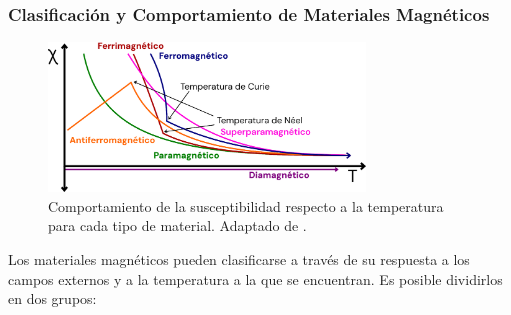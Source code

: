 \documentclass[../main.tex]{subfiles}
\begin{document}
\subsubsection{Clasificación y Comportamiento de Materiales Magnéticos} \label{sec:magtemp}
\begin{figure}[H]
    \centering
    \includegraphics[width=0.75\textwidth]{fig/chitemp.png}
    \caption{Comportamiento de la susceptibilidad respecto a la temperatura para cada tipo de material. Adaptado de \cite{Ohl2021}.}
    \label{fig:chitemp}
\end{figure}
Los materiales magnéticos pueden clasificarse a través de su respuesta a los campos externos y a la temperatura a la que se encuentran. Es posible dividirlos en dos grupos:
\end{document}
